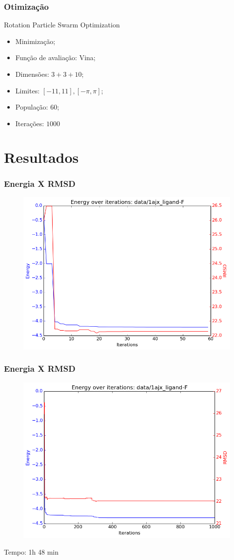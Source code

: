 \documentclass{beamer}
\begin{document}
\begin{frame}
\frametitle{Otimização}
Rotation Particle Swarm Optimization
\begin{itemize}
  \item Minimização;
  \item Função de avaliação: Vina;
  \item Dimensões: $3 + 3 + 10$;
  \item Limites: $[-11, 11], [-\pi, \pi]$;
  \item População: $60$;
  \item Iterações: $1000$
\end{itemize}
\end{frame}

\section{Resultados} %

\begin{frame}
\frametitle{Energia X RMSD}
\begin{figure}
\includegraphics[width=0.7\linewidth]{1ajx_ligand-F60_energy.png}
\end{figure}
\end{frame}

\begin{frame}
\frametitle{Energia X RMSD}
\begin{figure}
\includegraphics[width=0.7\linewidth]{1ajx_ligand-F1000_energy.png}
\end{figure}
Tempo: 1h 48 min
\end{frame}
\end{document}
